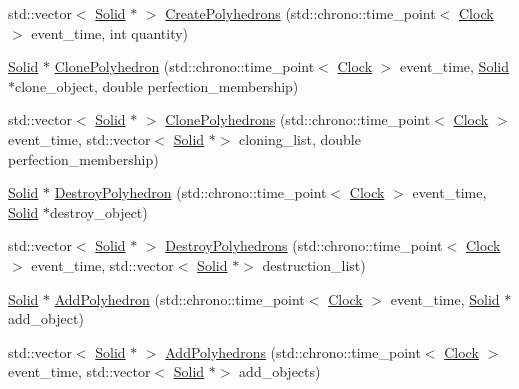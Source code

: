 \begin{DoxyCompactItemize}
\item 
std\+::vector$<$ \mbox{\hyperlink{classSolid}{Solid}} $\ast$ $>$ \mbox{\hyperlink{classSolid_a40b2ea07e384aff138ba139c3c84f525}{Create\+Polyhedrons}} (std\+::chrono\+::time\+\_\+point$<$ \mbox{\hyperlink{universe_8h_a0ef8d951d1ca5ab3cfaf7ab4c7a6fd80}{Clock}} $>$ event\+\_\+time, int quantity)
\item 
\mbox{\hyperlink{classSolid}{Solid}} $\ast$ \mbox{\hyperlink{classSolid_ae83094e9c002a7574db242ed0bff6288}{Clone\+Polyhedron}} (std\+::chrono\+::time\+\_\+point$<$ \mbox{\hyperlink{universe_8h_a0ef8d951d1ca5ab3cfaf7ab4c7a6fd80}{Clock}} $>$ event\+\_\+time, \mbox{\hyperlink{classSolid}{Solid}} $\ast$clone\+\_\+object, double perfection\+\_\+membership)
\item 
std\+::vector$<$ \mbox{\hyperlink{classSolid}{Solid}} $\ast$ $>$ \mbox{\hyperlink{classSolid_a1e650b6d8437acfaf7b9384b885d77bf}{Clone\+Polyhedrons}} (std\+::chrono\+::time\+\_\+point$<$ \mbox{\hyperlink{universe_8h_a0ef8d951d1ca5ab3cfaf7ab4c7a6fd80}{Clock}} $>$ event\+\_\+time, std\+::vector$<$ \mbox{\hyperlink{classSolid}{Solid}} $\ast$$>$ cloning\+\_\+list, double perfection\+\_\+membership)
\item 
\mbox{\hyperlink{classSolid}{Solid}} $\ast$ \mbox{\hyperlink{classSolid_a0841900d8ef4b82292ac027c4852b59b}{Destroy\+Polyhedron}} (std\+::chrono\+::time\+\_\+point$<$ \mbox{\hyperlink{universe_8h_a0ef8d951d1ca5ab3cfaf7ab4c7a6fd80}{Clock}} $>$ event\+\_\+time, \mbox{\hyperlink{classSolid}{Solid}} $\ast$destroy\+\_\+object)
\item 
std\+::vector$<$ \mbox{\hyperlink{classSolid}{Solid}} $\ast$ $>$ \mbox{\hyperlink{classSolid_ab1652ee511ed51bbe6a0a3b1854b7974}{Destroy\+Polyhedrons}} (std\+::chrono\+::time\+\_\+point$<$ \mbox{\hyperlink{universe_8h_a0ef8d951d1ca5ab3cfaf7ab4c7a6fd80}{Clock}} $>$ event\+\_\+time, std\+::vector$<$ \mbox{\hyperlink{classSolid}{Solid}} $\ast$$>$ destruction\+\_\+list)
\item 
\mbox{\hyperlink{classSolid}{Solid}} $\ast$ \mbox{\hyperlink{classSolid_a87a3b588f931ff20f09a5d46f6cb7907}{Add\+Polyhedron}} (std\+::chrono\+::time\+\_\+point$<$ \mbox{\hyperlink{universe_8h_a0ef8d951d1ca5ab3cfaf7ab4c7a6fd80}{Clock}} $>$ event\+\_\+time, \mbox{\hyperlink{classSolid}{Solid}} $\ast$add\+\_\+object)
\item 
std\+::vector$<$ \mbox{\hyperlink{classSolid}{Solid}} $\ast$ $>$ \mbox{\hyperlink{classSolid_a649ba1103a9889bc9e45256633dc72c3}{Add\+Polyhedrons}} (std\+::chrono\+::time\+\_\+point$<$ \mbox{\hyperlink{universe_8h_a0ef8d951d1ca5ab3cfaf7ab4c7a6fd80}{Clock}} $>$ event\+\_\+time, std\+::vector$<$ \mbox{\hyperlink{classSolid}{Solid}} $\ast$$>$ add\+\_\+objects)
$$
\end{DoxyCompactItemize}
